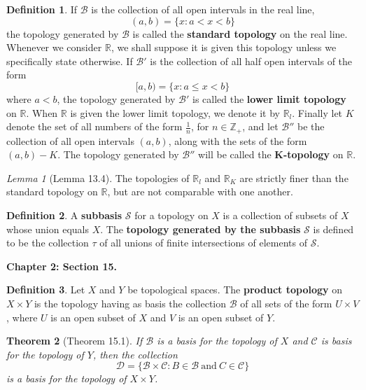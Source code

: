 \documentclass{article}
\newtheorem{theorem}{Theorem}
\theoremstyle{definition}
\newtheorem{definition}{Definition}[section]
\theoremstyle{remark}
\newtheorem{lemma}[theorem]{Lemma}
\begin{document}
    \begin{definition}
        If $\mathcal{B}$ is the collection of all open intervals in the real line,
        \[ (a,b) = \{x: a < x < b\} \]
        the topology generated by $\mathcal{B}$ is called the \textbf{standard topology} on the real line. Whenever we consider
        $\mathbb{R}$, we shall suppose it is given this topology unless we specifically state otherwise. If $\mathcal{B}'$ is the
        collection of all half open intervals of the form
        \[ [a,b) = \{x: a\leq x < b\} \]
        where $a < b$, the topology generated by $\mathcal{B}'$ is called the \textbf{lower limit topology} on $\mathbb{R}$.
        When $\mathbb{R}$ is given the lower limit topology, we denote it by $\mathbb{R}_l$. Finally let $K$ denote the
        set of all numbers of the form $\frac{1}{n}$, for $n\in\mathbb{Z}_+$, and let $\mathcal{B}''$ be the collection of
        all open intervals $(a,b)$, along with the sets of the form $(a,b) - K$. The topology generated by $\mathcal{B}''$ will
        be called the \textbf{K-topology} on $\mathbb{R}$.
    \end{definition}

    \begin{lemma}[Lemma 13.4]
        The topologies of $\mathbb{R}_l$ and $\mathbb{R}_K$ are strictly finer than the standard topology on $\mathbb{R}$, but are
        not comparable with one another.
    \end{lemma}

    \begin{definition}
        A \textbf{subbasis} $\mathcal{S}$ for a topology on $X$ is a collection of subsets of $X$ whose union equals $X$. The
        \textbf{topology generated by the subbasis} $\mathcal{S}$ is defined to be the collection $\tau$ of all unions of finite
        intersections of elements of $\mathcal{S}$.
    \end{definition}

    \newpage

    \textbf{Chapter 2: Section 15.}
    \begin{definition}
        Let $X$ and $Y$ be topological spaces. The \textbf{product topology} on $X\times Y$ is the topology having as basis the
        collection $\mathcal{B}$ of all sets of the form $U\times V$, where $U$ is an open subset of $X$ and $V$ is an open subset
        of $Y$.
    \end{definition}

    \begin{theorem}[Theorem 15.1]
        If $\mathcal{B}$ is a basis for the topology of $X$ and $\mathcal{C}$ is basis for the topology of $Y$, then the collection
        \[ \mathcal{D} = \{\mathcal{B}\times \mathcal{C}: B\in\mathcal{B}\:\text{and}\: C\in\mathcal{C}\} \]
        is a basis for the topology of $X\times Y$.
    \end{theorem}
\end{document}

